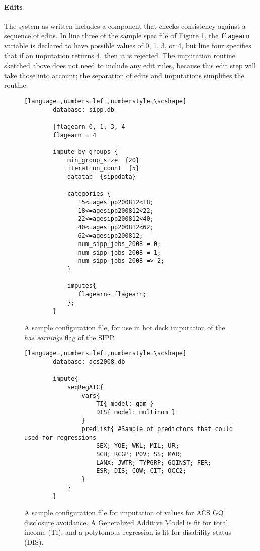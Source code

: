 \documentclass{article}
\begin{document}
        \paragraph{Edits} The system as written includes a component that checks consistency
        against a sequence of edits. In line three of the sample spec file of Figure
        \ref{sippconfig}, the {\tt flagearn} variable is declared to have possible values of 0,
        1, 3, or 4, but line four specifies that if an imputation returns 4, then it is rejected.
        The imputation routine sketched above does not need to include any edit rules, because
        this edit step will take those into account; the separation of edits and imputations
        simplifies the routine.

        \begin{figure}
        \begin{lstlisting}[language=,numbers=left,numberstyle=\scshape]
        database: sipp.db

        |flagearn 0, 1, 3, 4
        flagearn = 4

        impute_by_groups {
            min_group_size  {20}
            iteration_count  {5}
            datatab  {sippdata}

            categories {
               15<=agesipp200812<18;
               18<=agesipp200812<22;
               22<=agesipp200812<40;
               40<=agesipp200812<62;
               62<=agesipp200812;
               num_sipp_jobs_2008 = 0;
               num_sipp_jobs_2008 = 1;
               num_sipp_jobs_2008 => 2;
            }

            imputes{
               flagearn~ flagearn;
            };
        }
        \end{lstlisting}
        \caption{A sample configuration file, for use in hot deck imputation of the {\em
        has earnings} flag of the SIPP. }
        \label{sippconfig}
        \end{figure}

        \begin{figure}
        \begin{lstlisting}[language=,numbers=left,numberstyle=\scshape]
        database: acs2008.db

        impute{
            seqRegAIC{
                vars{
                    TI{ model: gam }
                    DIS{ model: multinom }
                }
                predlist{ #Sample of predictors that could used for regressions
                    SEX; YOE; WKL; MIL; UR;
                    SCH; RCGP; POV; SS; MAR;
                    LANX; JWTR; TYPGRP; GQINST; FER;
                    ESR; DIS; COW; CIT; OCC2;
                }
            }
        }

        \end{lstlisting}
        \caption{A sample configuration file for imputation of values for ACS GQ
        disclosure avoidance. A Generalized Additive Model is fit for total income (TI),
        and a polytomous regression is fit for disability status (DIS). }
        \label{acsconfig}
        \end{figure}
\else \fi
\end{document}
